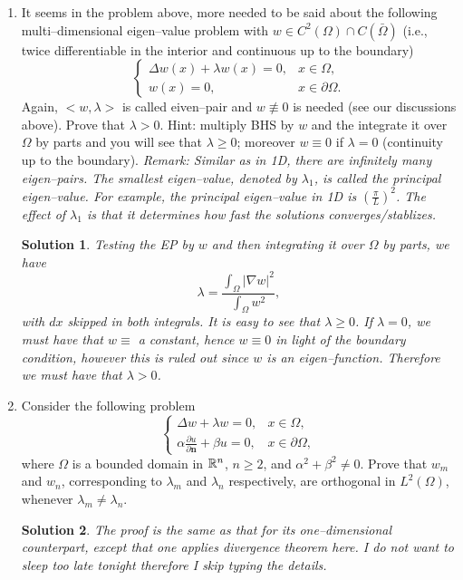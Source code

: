 \documentclass[6pt]{article}
\newtheorem{solution}{Solution}
\numberwithin{equation}{section}
\def\mathbb{\Bbb}
\begin{document}
\begin{enumerate}
\item It seems in the problem above, more needed to be said about the following multi--dimensional eigen--value problem with $w\in C^2(\Omega)\cap C(\bar\Omega)$ (i.e., twice differentiable in the interior and continuous up to the boundary)
\begin{equation}\label{DEP}
\left\{
\begin{array}{ll}
\Delta w(x)+\lambda w(x)=0,& x\in\Omega,\\
w(x)=0, &x\in\partial \Omega.
\end{array}
\right.
\end{equation}
Again, $<w,\lambda>$ is called eiven--pair and $w\not\equiv0$ is needed (see our discussions above).  Prove that $\lambda>0$.  Hint: multiply BHS by $w$ and the integrate it over $\Omega$ by parts and you will see that $\lambda\geq0$; moreover $w\equiv 0$ if $\lambda=0$ (continuity up to the boundary).  \emph{Remark: Similar as in 1D, there are infinitely many eigen--pairs.  The smallest eigen--value, denoted by $\lambda_1$, is called the principal eigen--value.  For example, the principal eigen--value in 1D is $(\frac{\pi}{L})^2$.  The effect of $\lambda_1$ is that it determines how fast the solutions converges/stablizes.}
\begin{solution}
Testing the EP by $w$ and then integrating it over $\Omega$ by parts, we have
\[\lambda=\frac{\int_\Omega |\nabla w|^2}{\int_\Omega w^2},\]
with $dx$ skipped in both integrals.  It is easy to see that $\lambda \geq0$.  If $\lambda=0$, we must have that $w\equiv$ a constant, hence $w\equiv 0$ in light of the boundary condition, however this is ruled out since $w$ is an eigen--function.  Therefore we must have that $\lambda>0$.
\end{solution}

\item Consider the following problem
\begin{equation}\label{ndep}
\left\{
\begin{array}{ll}
\Delta w+\lambda w=0,& x\in \Omega,\\
\alpha\frac{\partial u}{\partial \textbf{n}}+\beta u=0, &x\in\partial\Omega,
\end{array}
\right.
\end{equation}
where $\Omega$ is a bounded domain in $\mathbb R^n$, $n\geq2$, and $\alpha^2+\beta^2\neq0$.  Prove that $w_m$ and $w_n$, corresponding to $\lambda_m$ and $\lambda_n$ respectively, are orthogonal in $L^2(\Omega)$, whenever $\lambda_m\neq \lambda_n$.
\begin{solution}
The proof is the same as that for its one--dimensional counterpart, except that one applies divergence theorem here.  I do not want to sleep too late tonight therefore I skip typing the details.
\end{solution}


\end{enumerate}
\end{document}
